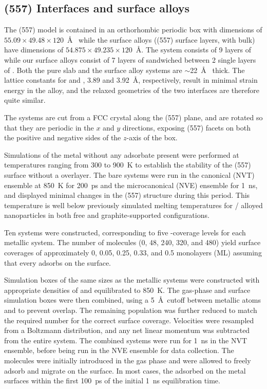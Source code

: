 \subsection{(557) Interfaces and surface alloys}
The (557) model is contained in an orthorhombic periodic box
with dimensions of $55.09 \times 49.48 \times 120$~\AA~ while the
surface alloys ((557) surface layers, with  bulk) have
dimensions of $54.875 \times 49.235 \times 120$~\AA.  The 
system consists of 9 layers of  while our surface alloys
consist of 7 layers of  sandwiched between 2 single layers of
.  Both the pure  slab and the surface alloy systems are
$\sim$22~\AA~ thick. The lattice constants for  and ,
3.89 and 3.92~\AA, respectively, result in minimal strain energy in
the alloy, and the relaxed geometries of the two interfaces are
therefore quite similar.

The systems are cut from a FCC crystal along the (557) plane, and are
rotated so that they are periodic in the $x$ and $y$ directions,
exposing (557) facets on both the positive and negative sides of the
$z$-axis of the box.

Simulations of the metal without any adsorbate present were performed
at temperatures ranging from 300 to 900~K to establish the stability
of the (557) surface without a  overlayer.  The bare systems
were run in the canonical (NVT) ensemble at 850~K for 200~ps and the
microcanonical (NVE) ensemble for 1~ns, and displayed minimal changes
in the (557) structure during this period.  This temperature is well
below previously simulated melting temperatures for /
alloyed nanoparticles in both free and graphite-supported
configurations.\citep{Sankaranarayanan:2005bh,Sankaranarayanan:2005qf,Fernandez:2013yg}

Ten systems were constructed, corresponding to five -coverage
levels for each metallic system.  The number of  molecules (0,
48, 240, 320, and 480) yield surface coverages of approximately 0,
0.05, 0.25, 0.33, and 0.5 monolayers (ML) assuming that every 
adsorbs on the surface.

Simulation boxes of the same sizes as the metallic systems were
constructed with appropriate densities of  and equilibrated to
850~K. The gas-phase  and surface simulation boxes were then
combined, using a 5~\AA\ cutoff between metallic atoms and  to
prevent overlap. The remaining  population was further reduced
to match the required number for the correct surface coverage.
Velocities were resampled from a Boltzmann distribution, and any net
linear momentum was subtracted from the entire system.  The combined
systems were run for 1~ns in the NVT ensemble, before being run in the
NVE ensemble for data collection.  The  molecules were
initially introduced in the gas phase and were allowed to freely
adsorb and migrate on the surface.  In most cases, the 
adsorbed on the metal surfaces within the first 100~ps of the initial
1~ns equilibration time.

